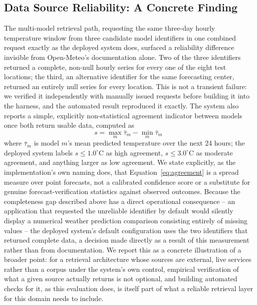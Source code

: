 \documentclass[sigconf,natbib=true,anonymous=true]{acmart}
\begin{document}
\subsection{Data Source Reliability: A Concrete Finding}

The multi-model retrieval path, requesting the same three-day hourly temperature window from three candidate model identifiers in one combined request exactly as the deployed system does, surfaced a reliability difference invisible from Open-Meteo's documentation alone. Two of the three identifiers returned a complete, non-null hourly series for every one of the eight test locations; the third, an alternative identifier for the same forecasting center, returned an entirely null series for every location. This is not a transient failure: we verified it independently with manually issued requests before building it into the harness, and the automated result reproduced it exactly. The system also reports a simple, explicitly non-statistical agreement indicator between models once both return usable data, computed as
\begin{equation}
  s = \max_m \bar{\tau}_m - \min_m \bar{\tau}_m
  \label{eq:agreement}
\end{equation}
where $\bar{\tau}_m$ is model $m$'s mean predicted temperature over the next 24 hours; the deployed system labels $s \le 1.0^{\circ}\mathrm{C}$ as high agreement, $s \le 3.0^{\circ}\mathrm{C}$ as moderate agreement, and anything larger as low agreement. We state explicitly, as the implementation's own naming does, that Equation~\ref{eq:agreement} is a spread measure over point forecasts, not a calibrated confidence score or a substitute for genuine forecast-verification statistics against observed outcomes. Because the completeness gap described above has a direct operational consequence -- an application that requested the unreliable identifier by default would silently display a numerical weather prediction comparison consisting entirely of missing values -- the deployed system's default configuration uses the two identifiers that returned complete data, a decision made directly as a result of this measurement rather than from documentation. We report this as a concrete illustration of a broader point: for a retrieval architecture whose sources are external, live services rather than a corpus under the system's own control, empirical verification of what a given source actually returns is not optional, and building automated checks for it, as this evaluation does, is itself part of what a reliable retrieval layer for this domain needs to include.
\end{document}
